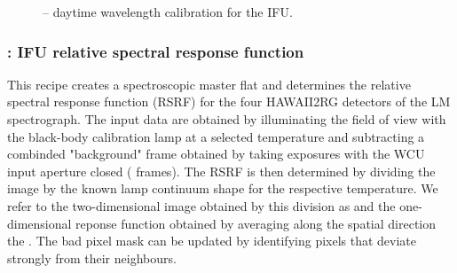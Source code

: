\begin{figure}[hb]
    \centering
    \def \globalscale {0.700000}
    \fontsize{10}{12}\selectfont
    
  \caption[Recipe: ]{ --
    daytime wavelength calibration for the IFU.}
  \label{fig:metis_ifu_wavecal}
\end{figure}


\clearpage
\subsubsection{: IFU relative spectral response function}
\label{sssec:ifu_rsrf}
\label{rec:metis_ifu_rsrf}

This recipe creates a spectroscopic master flat and determines the
relative spectral response function (RSRF) for the four HAWAII2RG
detectors of the LM spectrograph. The input data are obtained by
illuminating the field of view with the black-body calibration lamp at
a selected temperature and subtracting a combinded "background" frame obtained
by taking exposures with the \ac{WCU} input aperture closed (
frames).
The RSRF is then determined by dividing the image by the known lamp continuum
shape for the respective temperature. We refer to the two-dimensional image
obtained by this division as  and the one-dimensional reponse
function obtained by averaging along the spatial direction the
. The bad pixel mask can be updated by identifying pixels
that deviate strongly from their neighbours.

